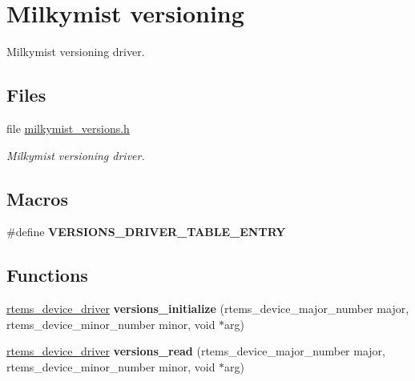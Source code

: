 \hypertarget{group__lm32__milkymist__versions}{}\section{Milkymist versioning}
\label{group__lm32__milkymist__versions}


Milkymist versioning driver.  


\subsection*{Files}
\begin{DoxyCompactItemize}
\item 
file \mbox{\hyperlink{milkymist__versions_8h}{milkymist\+\_\+versions.\+h}}
\begin{DoxyCompactList}\small\item\em Milkymist versioning driver. \end{DoxyCompactList}\end{DoxyCompactItemize}
\subsection*{Macros}
\begin{DoxyCompactItemize}
\item 
\#define {\bfseries V\+E\+R\+S\+I\+O\+N\+S\+\_\+\+D\+R\+I\+V\+E\+R\+\_\+\+T\+A\+B\+L\+E\+\_\+\+E\+N\+T\+RY}
\end{DoxyCompactItemize}
\subsection*{Functions}
\begin{DoxyCompactItemize}
\item 
\mbox{\label{group__lm32__milkymist__versions_gae0f24a0624536e82a99225351aa1a3a7}} 
\mbox{\hyperlink{group__ClassicStatus_ga545d41846817eaba6143d52ee4d9e9fe}{rtems\+\_\+device\+\_\+driver}} {\bfseries versions\+\_\+initialize} (rtems\+\_\+device\+\_\+major\+\_\+number major, rtems\+\_\+device\+\_\+minor\+\_\+number minor, void $\ast$arg)
\item 
\mbox{\label{group__lm32__milkymist__versions_ga37fcb0ed4c905fd4257b01026b27ac92}} 
\mbox{\hyperlink{group__ClassicStatus_ga545d41846817eaba6143d52ee4d9e9fe}{rtems\+\_\+device\+\_\+driver}} {\bfseries versions\+\_\+read} (rtems\+\_\+device\+\_\+major\+\_\+number major, rtems\+\_\+device\+\_\+minor\+\_\+number minor, void $\ast$arg)
\end{DoxyCompactItemize}


